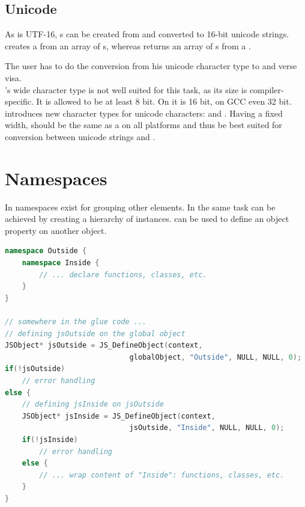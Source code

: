 \subsection{Unicode}

As  is UTF-16, s can be created from and converted to 16-bit unicode strings.\\
 creates a  from an array of s, whereas \linebreak{} returns an array of s from a .

The  user has to do the conversion from his unicode character type to  and verse visa.\\
's wide character type  is not well suited for this task, as its size is compiler-specific. It is allowed to be at least 8 bit. On  it is 16 bit, on GCC even 32 bit.\\
 introduces new character types for unicode characters:  and . Having a fixed width,  should be the same as a  on all platforms and thus be best suited for conversion between unicode strings and .

\section{Namespaces}

In  namespaces exist for grouping other elements. In  the same task can be achieved by creating a hierarchy of  instances.  can be used to define an object property on another object.

\SingleSpacing
\begin{lstlisting}[language=C++, caption=Wrapping a namespace]
namespace Outside {
	namespace Inside {
		// ... declare functions, classes, etc.
	}
}

// somewhere in the glue code ...
// defining jsOutside on the global object
JSObject* jsOutside = JS_DefineObject(context, 
                             globalObject, "Outside", NULL, NULL, 0);
if(!jsOutside)
	// error handling
else {
	// defining jsInside on jsOutside
	JSObject* jsInside = JS_DefineObject(context, 
                             jsOutside, "Inside", NULL, NULL, 0);
	if(!jsInside)
		// error handling
	else {
		// ... wrap content of "Inside": functions, classes, etc.
	}
}
\end{lstlisting}
\OnehalfSpacing

